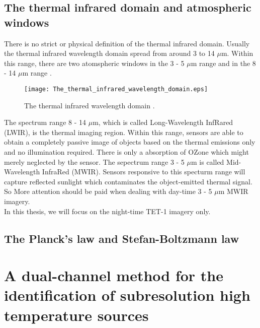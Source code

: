 
\subsection{The thermal infrared  domain and atmospheric windows}
There is no strict or physical definition of the thermal infrared domain. Usually the thermal infrared wavelength domain spread from around 3 to 14 $\mu$m. Within this range, there are two atomspheric windows in the 3 - 5 $\mu$m range and in the 8 - 14 $\mu$m range \parencite{Reference204}. \\

\begin{figure}[!htbp]
  \centering\texttt{[image: The\_thermal\_infrared\_wavelength\_domain.eps]}
  \caption{The thermal infrared wavelength domain \parencite{Reference204}.}
  \label{fig:TIRdomain}
\end{figure}

\noindent The spectrum range 8 - 14 $\mu$m, which is called Long-Wavelength InfRared (LWIR), is the thermal imaging region. Within this range, sensors are able to obtain a completely passive image of objects based on the thermal emissions only and no illumination required. There is only a absorption of OZone which might merely neglected by the sensor. The sepectrum range 3 - 5 $\mu$m is called Mid-Wavelength InfraRed (MWIR). Sensors responsive to this specturm range will capture reflected sunlight which contaminates the object-emitted thermal signal. So More attention should be paid when dealing with day-time 3 - 5 $\mu$m MWIR imagery. \\

\noindent In this thesis, we will focus on the night-time TET-1 imagery only. \\


\subsection{The Planck's law and Stefan-Boltzmann law}


\section{A dual-channel method for the identification of subresolution high temperature sources}


